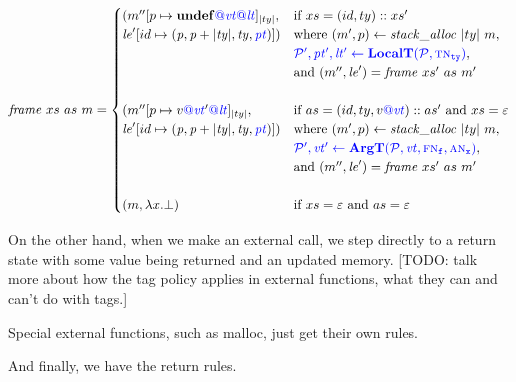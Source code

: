 \documentclass{llncs}
\begin{document}
\[\mathit{frame} ~ xs ~ as ~ m =
\begin{cases}
  (m''[p \mapsto \mathbf{undef}{\color{blue} @}\mathit{\color{blue} vt}{\color{blue} @}\mathit{\color{blue} lt}]_{|ty|}, & \textnormal{if } xs = (id,ty)::xs' \\
  \mathit{le}'[id \mapsto (\mathit{p, p+|ty|,ty,\mathit{\color{blue} pt}})]) &
  \textnormal{where } (m',p) \leftarrow \mathit{stack\_alloc} ~ |ty| ~ m, \\
  & {\color{blue} \mathcal{\color{blue} P\mathit{'}}, \mathit{\color{blue} pt'}, \mathit{\color{blue} lt'} \leftarrow \color{blue} \mathbf{LocalT}(\mathcal{\color{blue} P\mathit{}}, {\color{blue} \textnormal{\sc tn}_{\mathtt{ty}}})}, \\
  & \textnormal{and } (m'',\mathit{le}') = \mathit{frame} ~ xs' ~ as ~ m' \\ 
  \\
  (m''[p \mapsto v{\color{blue} @}\mathit{\color{blue} vt}'{\color{blue} @}\mathit{\color{blue} lt}]_{|ty|}, & \textnormal{if } as = (id,ty,v {\color{blue} @} \mathit{\color{blue} vt})::as' \textnormal{ and } xs = \varepsilon \\
  \mathit{le}'[id \mapsto (\mathit{p, p+|ty|,ty,\mathit{\color{blue} pt}})]) &
  \textnormal{where } (m',p) \leftarrow \mathit{stack\_alloc} ~ |ty| ~ m, \\
  & {\color{blue} \mathcal{\color{blue} P\mathit{'}}, \mathit{\color{blue} vt'} \leftarrow \color{blue} \mathbf{ArgT}(\mathcal{\color{blue} P\mathit{}}, \mathit{\color{blue} vt}, {\color{blue} \textnormal{\sc fn}_{\mathtt{f}}}, {\color{blue} \textnormal{\sc an}_{\mathtt{x}}})}, \\
  & \textnormal{and } (m'',\mathit{le}') = \mathit{frame} ~ xs' ~ as ~ m' \\
  \\
  (m, \lambda x . \bot) & \textnormal{if } xs = \varepsilon \textnormal{ and } as = \varepsilon \\
\end{cases}\]

\callstep

On the other hand, when we make an external call, we step directly to a return state with some value
being returned and an updated memory. [TODO: talk more about how the tag policy applies in external
  functions, what they can and can't do with tags.]

\extcallstep

Special external functions, such as malloc, just get their own rules.

\mallocstep

And finally, we have the return rules.

\returnstep
\retvalstep
\retnovalstep


  
\end{document}
